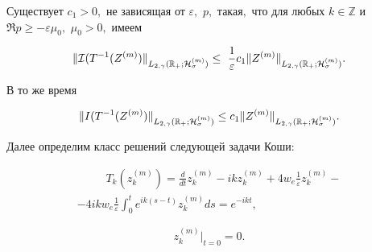 \begin{lemma}[2]Существует $c_1>0,$ не зависящая от $\varepsilon,$  $p,$ такая$,$ что для любых $k\in \mathbb Z$ и $\Re p\ge -\varepsilon \mu_0,$ $\mu_0>0,$ имеем

\begin{equation}

\|{\cal I}(T^{-1}(Z^{(m)})\|_{L_{2,\gamma}(\mathbb R_{+}; {\cal H}^{(m)}_\sigma)}\le~\frac1\varepsilon c_1

 \| Z^{(m)}\|_{L_{2,\gamma}(\mathbb R_{+}; {\cal H}^{(m)}_\sigma)}.

 \label{duh:estIT-1Z}

 \end{equation}

В то же время 

\begin{equation}

\|I(T^{-1}(Z^{(m)})\|_{L_{2,\gamma}(\mathbb R_{+}; {\cal H}^{(m)}_\sigma)}\le c_1 \|Z^{(m)}\|_{L_{2,\gamma}(\mathbb R_{+}; {\cal H}^{(m)}_\sigma)}.

 \label{duh:estIIT-1Z}

 \end{equation}

\end{lemma}



\smallskip



Далее определим класс решений следующей задачи Коши:

\begin{multline}

\,\hspace{1cm} T_k(z^{(m)}_k)=\frac{d}{dt}z^{(m)}_k-ikz^{(m)}_k+4w_e\frac1\varepsilon z^{(m)}_k - \\ -4ikw_e\frac1\varepsilon \int_0^t e^{ik(s-t)}z^{(m)}_kds=e^{-ikt}, \hspace{1cm} \,

\label{duh:sol}

\end{multline}

$$

z^{(m)}_k\big|_{t=0}=0.

$$





\smallskip



